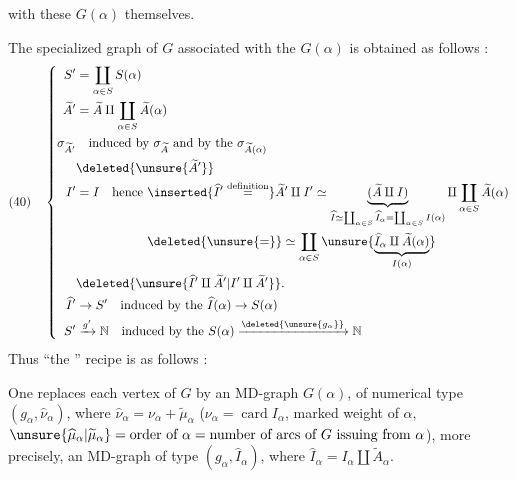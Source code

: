 with these $G(\alpha)$ themselves.

The specialized graph  of $G$ associated with the $G(\alpha)$ is obtained as follows :
\[
(40)\quad\left\{\begin{aligned}
S'&=\coprod_{\alpha\in S}S(\alpha)\\
\widetilde A'&=\widetilde A\amalg\coprod_{\alpha\in S}\widetilde A(\alpha)\\
\sigma_{\widetilde A'}&\quad\text{induced by }\sigma_{\widetilde A}\text{ and by the }\sigma_{\widetilde A(\alpha)}\\
&\deleted{\unsure{\widetilde A'}}\\
I'&=I\quad\text{hence }\begin{aligned}[t]
&\inserted{\widehat I'\overset{\mathrm{definition}}{=}}\widetilde A'\amalg I'\simeq\underbrace{(\widetilde A\amalg I)}_{\widehat I\simeq\coprod_{\alpha\in S}\widehat I_\alpha=\coprod_{\alpha\in S}I(\alpha)}\amalg\coprod_{\alpha\in S}\widetilde A(\alpha)\\
&\deleted{\unsure{=}}\simeq\coprod_{\alpha\in S}\unsure{\underbrace{\widehat I_\alpha\amalg\widetilde A(\alpha)}_{I(\alpha)}}
\end{aligned}\\
&\deleted{\unsure{\widehat I'\amalg\widetilde A'|I'\amalg\widetilde A'}}.\\
\widehat I'&\to S'\quad\text{induced by the }\widehat I(\alpha)\to S(\alpha)\\
S'&\xrightarrow{g'}\mathbb N\quad\text{induced by the }S(\alpha)\xrightarrow{\deleted{\unsure{g_\alpha}}}\mathbb N
\end{aligned}\right.
\]
Thus ``the '' recipe is as follows :

 One replaces each vertex  of $G$ by an MD-graph $G(\alpha)$, of numerical type $(g_\alpha,\widehat\nu_\alpha)$, where $\widehat\nu_\alpha=\nu_\alpha+\widetilde\mu_\alpha$ ($\nu_\alpha=\operatorname{card}I_\alpha$, marked weight of $\alpha$, $\unsure{\widehat\mu_\alpha|\widetilde\mu_\alpha}=\text{order of }\alpha=\text{number }\text{of arcs}\text{ of }G\text{ issuing from }\alpha$), more precisely, an MD-graph of type $(g_\alpha,\widehat I_\alpha)$, where $\widehat I_\alpha=I_\alpha\amalg\widetilde A_\alpha$.
